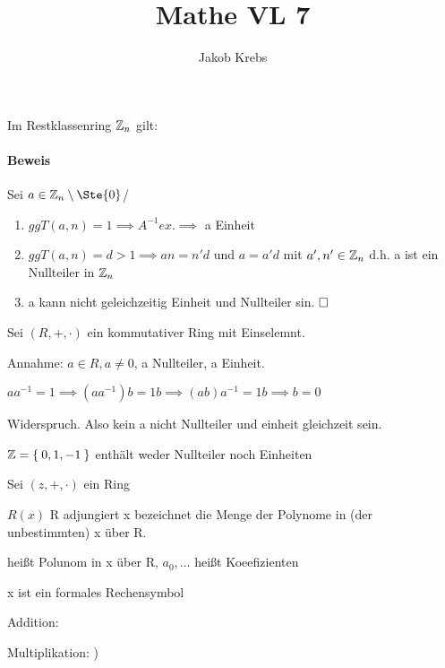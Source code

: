 \documentclass{../tudscript}
\author{Jakob Krebs}
\title{Mathe VL 7}
\begin{document}
Im Restklassenring $\mathbb{Z}_n$ gilt:
\paragraph{Beweis}
Sei $a \in \bZ_n \setminus \Ste{0}$/
\begin{enumerate}
\item $ggT(a, n) = 1 \implies A^{-1} ex. \implies$ a Einheit
\item $ggT(a, n) = d > 1 \implies an = n' d $ und $a = a' d$ mit $a', n' \in \mathbb{Z}_n$
  d.h. a ist ein Nullteiler in $\mathbb{Z}_n$
\item a kann nicht geleichzeitig Einheit und Nullteiler sin. $\hfill\square$
\end{enumerate}

Sei $(R, +, \cdot)$ ein kommutativer Ring mit Einselemnt.

Annahme: $a \in R, a \neq 0$, a Nullteiler, a Einheit.

$a a^{-1} = 1 \implies (a a^{-1})b = 1 b \implies (ab) a^{-1} = 1 b \implies b = 0$

Widerspruch. Also kein a nicht Nullteiler und einheit gleichzeit sein.

$\mathbb{Z} = \Set{0, 1, -1}$ enthält weder Nullteiler noch Einheiten


Sei $(z, +, \cdot)$ ein Ring

$R(x)$ R adjungiert x bezeichnet die Menge der Polynome in (der unbestimmten) x über R.


heißt Polunom in x über R, $a_0, \ldots$ heißt Koeefizienten

x ist ein formales Rechensymbol

Addition:


Multiplikation:
)
\end{document}
